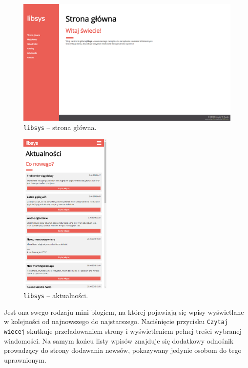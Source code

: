 \documentclass[12pt, a4paper]{article}
\begin{document}
\begin{figure}[h]
    \centering
    \includegraphics[width=\textwidth]{img/libsys_home.png}
    \caption{\texttt{libsys} -- strona główna.}
\end{figure}

\begin{figure}[h]
    \centering
    \includegraphics[width=0.4\textwidth]{img/libsys_news.png}
    \caption{\texttt{libsys} -- aktualności.}
\end{figure}

Jest ona swego rodzaju mini-blogiem, na której pojawiają się wpisy wyświetlane w kolejności od najnowszego do najstarszego. Naciśnięcie przycisku \texttt{Czytaj więcej} skutkuje przeładowaniem strony i wyświetleniem pełnej treści wybranej wiadomości. Na samym końcu listy wpisów znajduje się dodatkowy odnośnik prowadzący do strony dodawania newsów, pokazywany jedynie osobom do tego uprawnionym.
\end{document}
